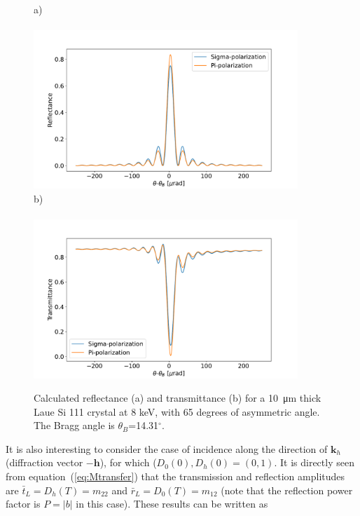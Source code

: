 \documentclass{iucr}
\begin{document}
\begin{figure}\label{fig:laueProfiles}
    \centering
    a)~~~~~~~~~~~~~~~~~~~~~~~~~~~~~~~~~~~~~~~~~~~~~~~~~~~~~~~~~~~~~~~~~~~~~\\
    \includegraphics[width=0.89\textwidth]{figures/Laue_1.pdf}
    b)~~~~~~~~~~~~~~~~~~~~~~~~~~~~~~~~~~~~~~~~~~~~~~~~~~~~~~~~~~~~~~~~~~~~~\\\includegraphics[width=0.89\textwidth]{figures/Laue_2.pdf}
    \caption{Calculated reflectance (a) and transmittance (b) for a \SI{10}{\micro\meter} thick Laue Si 111 crystal at 8 keV, with 65 degrees of asymmetric angle. The Bragg angle is $\theta_B$=14.31$^\circ$.}
\end{figure}

It is also interesting to consider the case of incidence along the direction of $\textbf{k}_h$ (diffraction vector $-\textbf{h}$), for which ($D_0(0), D_h(0)=(0,1)$. It is directly seen from equation~(\ref{eq:Mtransfer}) that the transmission and reflection amplitudes are $\bar{t}_L=D_h(T)=m_{22}$ and $\bar{r}_L=D_0(T)=m_{12}$ (note that the reflection power factor is $P=|b|$ in this case). These results can be written as
\end{document}
